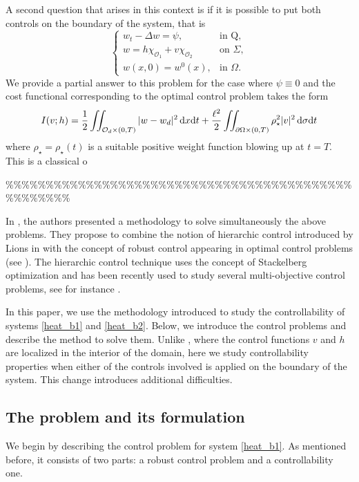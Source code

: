 \documentclass[preprint,10pt]{article}
\numberwithin{equation}{section}
\numberwithin{theorem}{section}
\def\dx{\,\textnormal{d}x}
\def\dt{\textnormal{d}t}
\def\d{\,\textnormal{d}}
\def\dx{\,\textnormal{d}x}
\def\dt{\textnormal{d}t}
\def\d{\,\textnormal{d}}
\begin{document}
{A second question that arises in this context is if it is possible to put both controls on the boundary of the system, that is
%
\begin{equation*}%
\begin{cases}
w_t-\Delta w=\psi, & \text{in Q}, \\
w=h\chi_{\mathcal O_1}+ v\chi_{\mathcal O_2}&\text{on } \Sigma, \\
w(x,0)=w^0(x), & \text{in } \Omega.
\end{cases}
\end{equation*}
%
We provide a partial answer to this problem for the case where $\psi\equiv 0$ and the cost functional corresponding to the optimal control problem takes the form
%
\begin{equation}
I(v;h)=\frac{1}{2}\iint_{\mathcal O_d\times(0,T)}|w-w_d|^2\dx\dt+\frac{\ell^2}{2}\iint_{\partial\Omega\times(0,T)}\rho_\star^2|v|^2\d\sigma\dt
\end{equation}
%
where $\rho_\star=\rho_\star(t)$ is a suitable positive weight function blowing up at $t=T$. This is a classical o



\vspace{5 cm}
\%\%\%\%\%\%\%\%\%\%\%\%\%\%\%\%\%\%\%\%\%\%\%\%\%\%\%\%\%\%\%\%\%\%\%\%\%\%\%\%\%\%\%\%\%\%\%\%\%\%\%

In \cite{vhs_deT_rob}, the authors presented a methodology to solve simultaneously the above problems. They propose to combine the notion of hierarchic control introduced by Lions in \cite{LionsSta} with the concept of robust control appearing in optimal control problems (see \cite{aziz,temam,temam_nonlinear}). The hierarchic control technique uses the concept of Stackelberg optimization and has been recently used to study several multi-objective control problems, see for instance \cite{araruna,AMR, Glowinski,Guillen,Limaco,LionsHier}. 

In this paper, we use the methodology introduced \cite{vhs_deT_rob} to study the controllability of systems \eqref{heat_b1} and \eqref{heat_b2}. Below, we introduce the control problems and describe the method to solve them. Unlike \cite{vhs_deT_rob}, where the control functions $v$ and $h$ are localized in the interior of the domain, here we study controllability properties when either of the controls involved is applied on the boundary of the system. This change introduces additional difficulties.  

\subsection{The problem and its formulation}
%
We begin by describing the control problem for system \eqref{heat_b1}. As mentioned before, it consists of two parts: a robust control problem and a controllability one.



}
\end{document}
